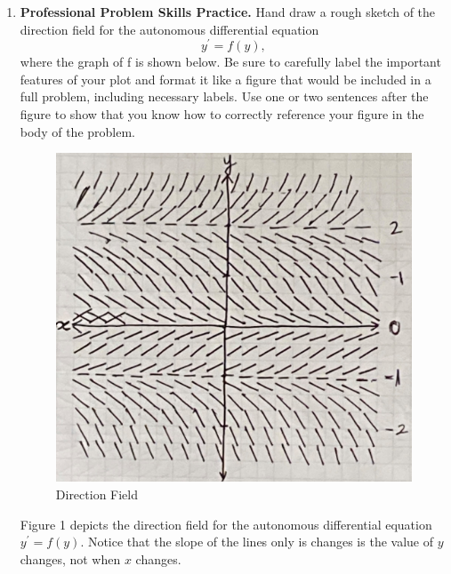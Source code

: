 \documentclass{article}
\begin{document}
\begin{enumerate}[label=\textbf{(1.\arabic*)}]
\item \textbf{Professional Problem Skills Practice.} Hand draw a rough sketch of the direction field for the autonomous differential equation
\[y^\prime = f(y),\]
where the graph of f is shown below. Be sure to carefully label the important features of your plot and format it like a figure that would be included in a full problem, including necessary labels. Use one or two sentences after the figure to show that you know how to correctly reference your figure in the body of the problem.
\begin{figure}[H]
\centering
\includegraphics[scale=0.1]{ppp}
\caption{Direction Field}
\end{figure}
Figure 1 depicts the direction field for the autonomous differential equation $y^\prime = f(y)$. Notice that the slope of the lines only is changes is the value of $y$ changes, not when $x$ changes.

\end{enumerate}
\end{document}

